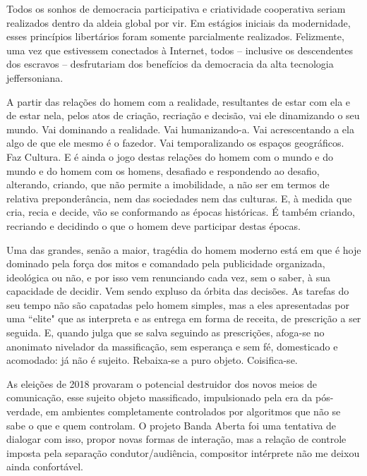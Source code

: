\begin{citacao}
Todos os sonhos de democracia participativa e criatividade cooperativa seriam realizados dentro da aldeia global por vir. Em estágios iniciais da modernidade, esses princípios libertários foram somente parcialmente realizados. Felizmente, uma vez que estivessem conectados à Internet, todos – inclusive os descendentes dos escravos – desfrutariam dos benefícios da democracia da alta tecnologia jeffersoniana.
\end{citacao}\cite[365]{Barbrook2009}
  
 \begin{citacao}
 
   A partir das relações do homem com a realidade, resultantes de estar com ela e de estar nela, pelos atos de criação, recriação e decisão, vai ele dinamizando o seu mundo. Vai dominando a realidade. Vai humanizando-a. Vai acrescentando a ela algo de que ele mesmo é o fazedor. Vai temporalizando os espaços geográficos. Faz Cultura. E é ainda o jogo destas relações do homem com o mundo e do mundo e do homem com os homens, desafiado e respondendo ao desafio, alterando, criando, que não permite a imobilidade, a não ser em termos de relativa preponderância, nem das sociedades nem das culturas. E, à medida que cria, recia e decide, vão se conformando as épocas históricas. É também criando, recriando e decidindo o que o homem deve participar destas épocas. \cite[60]{Freire2015}
    \end{citacao} 

   \begin{citacao}
   Uma das grandes, senão a maior, tragédia do homem moderno está em que é hoje dominado pela força dos mitos e comandado pela publicidade organizada, ideológica ou não, e por isso vem renunciando cada vez, sem o saber, à sua capacidade de decidir. Vem sendo expluso da órbita das decisões. As tarefas do seu tempo não são capatadas pelo homem simples, mas a eles apresentadas por uma ``elite" que as interpreta e as entrega em forma de receita, de prescrição a ser seguida. E, quando julga que se salva seguindo as prescrições, afoga-se no anonimato nivelador da massificação, sem esperança e sem fé, domesticado e acomodado: já não é sujeito. Rebaixa-se a puro objeto. Coisifica-se. \cite[60]{Freire2015}
 \end{citacao} 

As eleições de 2018 provaram o potencial destruidor dos novos meios de comunicação, esse sujeito objeto massificado, impulsionado pela era da pós-verdade, em ambientes completamente controlados por algoritmos que não se sabe o que e quem controlam. O projeto Banda Aberta foi uma tentativa de dialogar com isso, propor novas formas de interação, mas a relação de controle imposta pela separação condutor/audiência, compositor intérprete não me deixou ainda confortável. 

